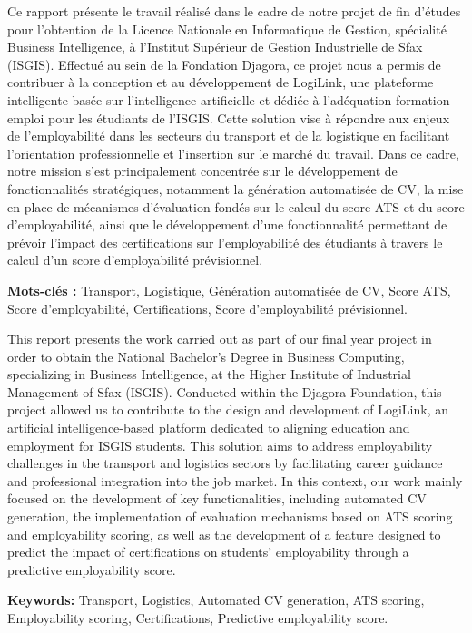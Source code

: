 
\par\vspace{12pt}
\thispagestyle{empty}
\enlargethispage{\baselineskip}
\noindent Ce rapport présente le travail réalisé dans le cadre de notre projet de fin d'études pour l'obtention de la Licence Nationale en Informatique de Gestion, spécialité Business Intelligence, à l'Institut Supérieur de Gestion Industrielle de Sfax (ISGIS). Effectué au sein de la Fondation Djagora, ce projet nous a permis de contribuer à la conception et au développement de LogiLink, une plateforme intelligente basée sur l'intelligence artificielle et dédiée à l'adéquation formation-emploi pour les étudiants de l'ISGIS. Cette solution vise à répondre aux enjeux de l'employabilité dans les secteurs du transport et de la logistique en facilitant l'orientation professionnelle et l'insertion sur le marché du travail. Dans ce cadre, notre mission s'est principalement concentrée sur le développement de fonctionnalités stratégiques, notamment la génération automatisée de CV, la mise en place de mécanismes d'évaluation fondés sur le calcul du score ATS et du score d'employabilité, ainsi que le développement d'une fonctionnalité permettant de prévoir l'impact des certifications sur l'employabilité des étudiants à travers le calcul d'un score d'employabilité prévisionnel.

\vspace{6pt}

\noindent \textbf{Mots-clés :} Transport, Logistique, Génération automatisée de CV, Score ATS, Score d'employabilité, Certifications, Score d'employabilité prévisionnel.

\vspace{0.5cm}

\par\vspace{12pt}

\noindent This report presents the work carried out as part of our final year project in order to obtain the National Bachelor's Degree in Business Computing, specializing in Business Intelligence, at the Higher Institute of Industrial Management of Sfax (ISGIS). Conducted within the Djagora Foundation, this project allowed us to contribute to the design and development of LogiLink, an artificial intelligence-based platform dedicated to aligning education and employment for ISGIS students. This solution aims to address employability challenges in the transport and logistics sectors by facilitating career guidance and professional integration into the job market. In this context, our work mainly focused on the development of key functionalities, including automated CV generation, the implementation of evaluation mechanisms based on ATS scoring and employability scoring, as well as the development of a feature designed to predict the impact of certifications on students' employability through a predictive employability score.

\vspace{6pt}

\noindent \textbf{Keywords:} Transport, Logistics, Automated CV generation, ATS scoring, Employability scoring, Certifications, Predictive employability score.